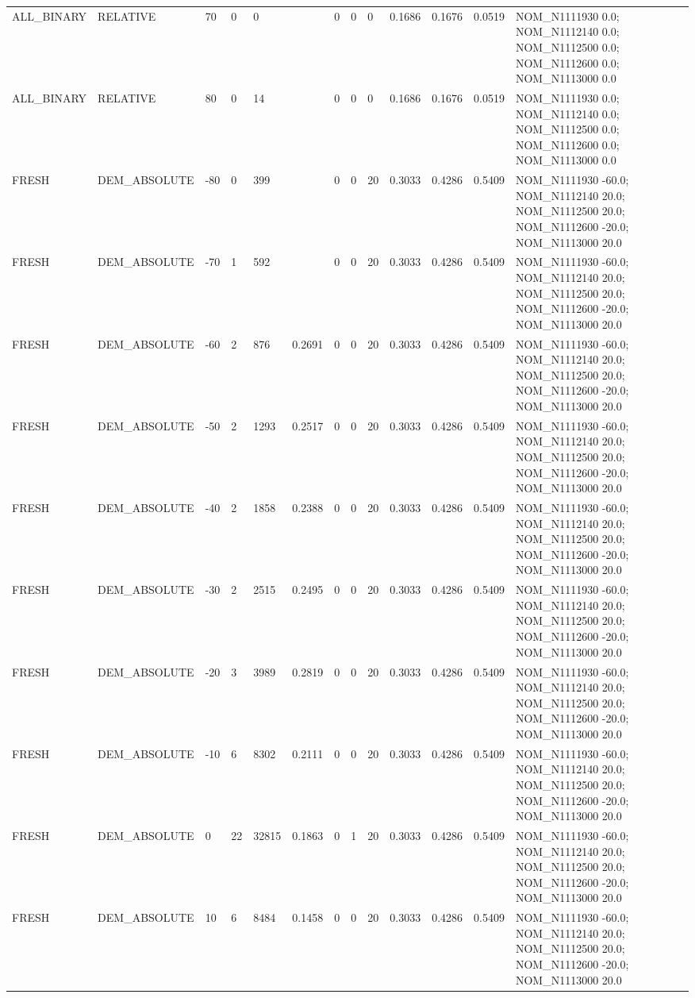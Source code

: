 \begin{table}[ht]
\begin{tabular}{lllllllllllll}
ALL\_BINARY & RELATIVE & 70 & 0 & 0 &  & 0 & 0 & 0 & 0.1686 & 0.1676 & 0.0519 & NOM\_N1111930 0.0; NOM\_N1112140 0.0; NOM\_N1112500 0.0; NOM\_N1112600 0.0; NOM\_N1113000 0.0 \\
ALL\_BINARY & RELATIVE & 80 & 0 & 14 &  & 0 & 0 & 0 & 0.1686 & 0.1676 & 0.0519 & NOM\_N1111930 0.0; NOM\_N1112140 0.0; NOM\_N1112500 0.0; NOM\_N1112600 0.0; NOM\_N1113000 0.0 \\
FRESH & DEM\_ABSOLUTE & -80 & 0 & 399 &  & 0 & 0 & 20 & 0.3033 & 0.4286 & 0.5409 & NOM\_N1111930 -60.0; NOM\_N1112140 20.0; NOM\_N1112500 20.0; NOM\_N1112600 -20.0; NOM\_N1113000 20.0 \\
FRESH & DEM\_ABSOLUTE & -70 & 1 & 592 &  & 0 & 0 & 20 & 0.3033 & 0.4286 & 0.5409 & NOM\_N1111930 -60.0; NOM\_N1112140 20.0; NOM\_N1112500 20.0; NOM\_N1112600 -20.0; NOM\_N1113000 20.0 \\
FRESH & DEM\_ABSOLUTE & -60 & 2 & 876 & 0.2691 & 0 & 0 & 20 & 0.3033 & 0.4286 & 0.5409 & NOM\_N1111930 -60.0; NOM\_N1112140 20.0; NOM\_N1112500 20.0; NOM\_N1112600 -20.0; NOM\_N1113000 20.0 \\
FRESH & DEM\_ABSOLUTE & -50 & 2 & 1293 & 0.2517 & 0 & 0 & 20 & 0.3033 & 0.4286 & 0.5409 & NOM\_N1111930 -60.0; NOM\_N1112140 20.0; NOM\_N1112500 20.0; NOM\_N1112600 -20.0; NOM\_N1113000 20.0 \\
FRESH & DEM\_ABSOLUTE & -40 & 2 & 1858 & 0.2388 & 0 & 0 & 20 & 0.3033 & 0.4286 & 0.5409 & NOM\_N1111930 -60.0; NOM\_N1112140 20.0; NOM\_N1112500 20.0; NOM\_N1112600 -20.0; NOM\_N1113000 20.0 \\
FRESH & DEM\_ABSOLUTE & -30 & 2 & 2515 & 0.2495 & 0 & 0 & 20 & 0.3033 & 0.4286 & 0.5409 & NOM\_N1111930 -60.0; NOM\_N1112140 20.0; NOM\_N1112500 20.0; NOM\_N1112600 -20.0; NOM\_N1113000 20.0 \\
FRESH & DEM\_ABSOLUTE & -20 & 3 & 3989 & 0.2819 & 0 & 0 & 20 & 0.3033 & 0.4286 & 0.5409 & NOM\_N1111930 -60.0; NOM\_N1112140 20.0; NOM\_N1112500 20.0; NOM\_N1112600 -20.0; NOM\_N1113000 20.0 \\
FRESH & DEM\_ABSOLUTE & -10 & 6 & 8302 & 0.2111 & 0 & 0 & 20 & 0.3033 & 0.4286 & 0.5409 & NOM\_N1111930 -60.0; NOM\_N1112140 20.0; NOM\_N1112500 20.0; NOM\_N1112600 -20.0; NOM\_N1113000 20.0 \\
FRESH & DEM\_ABSOLUTE & 0 & 22 & 32815 & 0.1863 & 0 & 1 & 20 & 0.3033 & 0.4286 & 0.5409 & NOM\_N1111930 -60.0; NOM\_N1112140 20.0; NOM\_N1112500 20.0; NOM\_N1112600 -20.0; NOM\_N1113000 20.0 \\
FRESH & DEM\_ABSOLUTE & 10 & 6 & 8484 & 0.1458 & 0 & 0 & 20 & 0.3033 & 0.4286 & 0.5409 & NOM\_N1111930 -60.0; NOM\_N1112140 20.0; NOM\_N1112500 20.0; NOM\_N1112600 -20.0; NOM\_N1113000 20.0 \\

\end{tabular}
\end{table}
